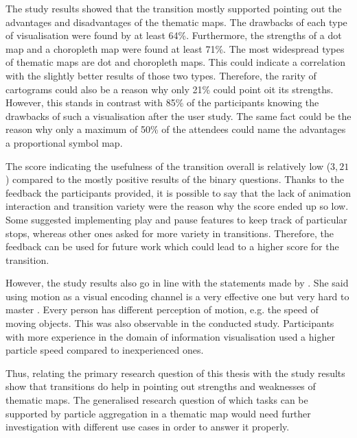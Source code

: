 The study results showed that the transition mostly supported pointing out the advantages and disadvantages of the thematic maps. The drawbacks of each type of visualisation were found by at least 64\%. Furthermore, the strengths of a dot map and a choropleth map were found at least 71\%.
The most widespread types of thematic maps are dot and choropleth maps. This could indicate a correlation with the slightly better results of those two types.
Therefore, the rarity of cartograms could also be a reason why only 21\% could point oit its strengths. However, this stands in contrast with 85\% of the participants knowing the drawbacks of such a visualisation after the user study.
The same fact could be the reason  why only a maximum of 50\% of the attendees could name the advantages a proportional symbol map.

The score indicating the usefulness of the transition overall is relatively low ($3,21$) compared to the mostly positive results of the binary questions. Thanks to the feedback the participants provided, it is possible to say that the lack of animation interaction and transition variety were the reason why the score ended up so low. Some suggested implementing play and pause features to keep track of particular stops, whereas other ones asked for more variety in transitions. Therefore, the feedback can be used for future work which could lead to a higher score for the transition.

However, the study results also go in line with the statements made by \citeauthor{Munzner2014}. She said using motion as a visual encoding channel is a very effective one but very hard to master . Every person has different perception of motion, e.g. the speed of moving objects. This was also observable in the conducted study. Participants with more experience in the domain of information visualisation used a higher particle speed compared to inexperienced ones.

Thus, relating the primary research question of this thesis with the study results show that transitions do help in pointing out strengths and weaknesses of thematic maps. The generalised research question of which tasks can be supported by particle aggregation in a thematic map would need further investigation with different use cases in order to answer it properly.